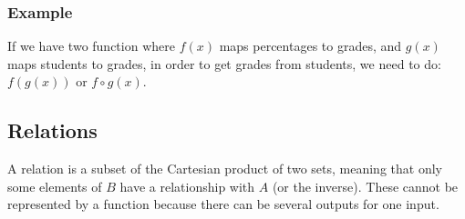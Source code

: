 \subsubsection{Example}\label{ssub:functioncompositionexamle}

If we have two function where \(f(x)\) maps percentages to grades, and \(g(x)\) maps students to grades, in order to get grades from students, we need to do: \(f(g(x))\) or \(f \circ g(x)\).

\subsection{Relations}\label{sub:relationspaseven}

A relation is a subset of the Cartesian product of two sets, meaning that only some elements of \(B\) have a relationship with \(A\) (or the inverse).
These cannot be represented by a function because there can be several outputs for one input.
